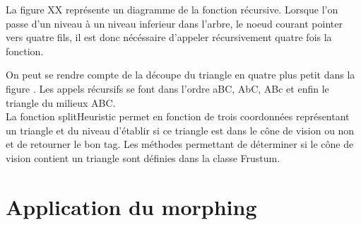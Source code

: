 \documentclass[10pt]{report}
\begin{document}
	La figure XX représente un diagramme de la fonction récursive. Lorsque l'on passe d'un niveau à un
	niveau inferieur dans l'arbre, le noeud courant pointer vers quatre fils, il est donc nécéssaire
	d'appeler récursivement quatre fois la fonction.
	
	On peut se rendre compte de la découpe du triangle en quatre plus petit dans la figure 
	\cite{TriangleSplit}.
	Les appels récursifs se font dans l'ordre aBC, AbC, ABc et enfin le triangle du milieux ABC.\\
	
	La fonction splitHeuristic permet en fonction de trois coordonnées représentant un triangle 
	et du niveau d'établir si ce triangle est dans le cône de vision ou non et de retourner le bon tag.
	Les méthodes permettant de déterminer si le cône de vision contient un triangle sont définies dans
	la classe Frustum.
	
  \section{Application du morphing}


  
  
  
  
  {}
  
  
  
\end{document}
